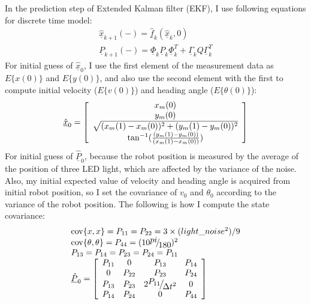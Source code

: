 \documentclass{article}
\begin{document}
In the prediction step of Extended Kalman filter (EKF), I use following equations for discrete time model:
\begin{eqnarray}
\underline{\hat{x}}_{k + 1}(-)  = \underline{\hat{f}}_k (\underline{\hat{x}}_k ,0)\\
\underline{P}_{k + 1} ( - ) = \underline{\Phi}_k \underline{P}_k \underline{\Phi}_k^T + \underline{\Gamma}_k Q \underline{\Gamma}_k^T 
\end{eqnarray}
For initial guess of $\underline{\hat{x}}_0$, I use the first element of the measurement data as $E\{x(0)\}$ and $E\{y(0)\}$, 
and also use the second element with the first to compute initial velocity ($E\{v(0)\}$) and heading angle ($E\{\theta(0)\}$):
\begin{equation}
\underline{\hat{x}}_0  = \left[ {\begin{array}{*{20}c}
   {x_m (0)}  \\
   {y_m (0)}  \\
   {\sqrt {(x_m (1) - x_m (0))^2  + (y_m (1) - y_m (0))^2 } }  \\
   {\tan ^{ - 1} (\frac{{(y_m (1) - y_m (0))}}{{(x_m (1) - x_m (0))}})}  \\
\end{array}} \right]
\end{equation} 
For initial guess of $\underline{\hat{P}}_0$, because the robot position is measured by the average of the 
position of three LED light, which are affected by the variance of the noise. Also, my initial expected value of 
velocity and heading angle is acquired from initial robot position, so I set the covariance of $v_0$ and $\theta_0$
according to the variance of the robot position.  The following is how I compute the state covariance:
\begin{equation}
	\begin{array}{l}
	 {\mathop{\rm cov}} \{ x,x\}  = P_{11}  = P_{22}  = 3 \times (light\_noise^2 )/9 \\ 
	 {\mathop{\rm cov}} \{ \theta ,\theta \}  = P_{44}  = (10{\raise0.7ex\hbox{${pi}$} \!\mathord{\left/
	 {\vphantom {{pi} {180}}}\right.\kern-\nulldelimiterspace}
	\!\lower0.7ex\hbox{${180}$}})^2  \\ 
	 P_{13}  = P_{14}  = P_{23}  = P_{24}  = P_{11}  \\ 
	 \underline{\hat{P}}_0  = \left[ {\begin{array}{*{20}c}
	   {P_{11} } & 0 & {P_{13} } & {P_{14} }  \\
	   0 & {P_{22} } & {P_{23} } & {P_{24} }  \\
	   {P_{13} } & {P_{23} } & {2{\raise0.7ex\hbox{${P_{11} }$} \!\mathord{\left/
	 {\vphantom {{P_{11} } {\Delta t^2 }}}\right.\kern-\nulldelimiterspace}
	\!\lower0.7ex\hbox{${\Delta t^2 }$}}} & 0  \\
	   {P_{14} } & {P_{24} } & 0 & {P_{44} }  \\
	\end{array}} \right] \\ 
	 \end{array}
\end{equation}
\end{document}
